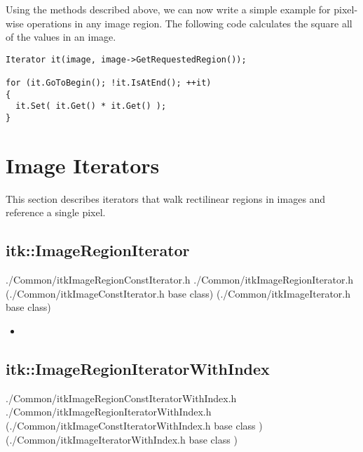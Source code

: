 Using the methods described above, we can now write a simple example for
pixel-wise operations in any image region.  The following code calculates the
square all of the values in an image.

\begin{verbatim}
Iterator it(image, image->GetRequestedRegion());

for (it.GoToBegin(); !it.IsAtEnd(); ++it)
{
  it.Set( it.Get() * it.Get() );
}
\end{verbatim}


\section{Image Iterators}
\label{sec:ImageIterators}
This section describes iterators that walk rectilinear regions in images and
reference a single pixel.


\subsection{itk::ImageRegionIterator}
\label{sec:itkImageRegionIterator}
./Common/itkImageRegionConstIterator.h
./Common/itkImageRegionIterator.h
(./Common/itkImageConstIterator.h base class)
(./Common/itkImageIterator.h base class)




\begin{itemize}
\item{\textbf{}}
\end{itemize}



\subsection{itk::ImageRegionIteratorWithIndex}
\label{sec:itkImageRegionIteratorWithIndex}
./Common/itkImageRegionConstIteratorWithIndex.h
./Common/itkImageRegionIteratorWithIndex.h
(./Common/itkImageConstIteratorWithIndex.h  base class )
(./Common/itkImageIteratorWithIndex.h  base class )


